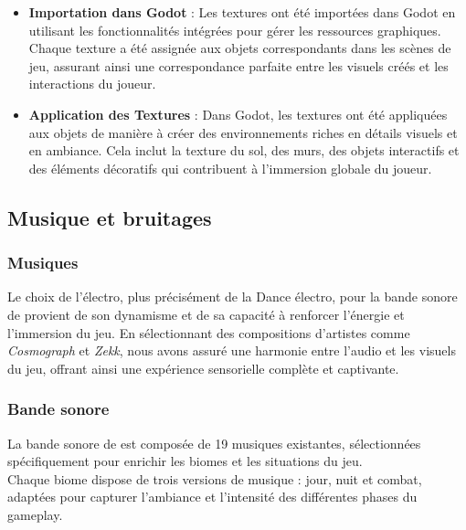 \begin{itemize}
    \item \textbf{Importation dans Godot} : Les textures ont été importées dans Godot en utilisant les fonctionnalités intégrées pour gérer les ressources graphiques. Chaque texture a été assignée aux objets correspondants dans les scènes de jeu, assurant ainsi une correspondance parfaite entre les visuels créés et les interactions du joueur.
    \\

    \item \textbf{Application des Textures} : Dans Godot, les textures ont été appliquées aux objets de manière à créer des environnements riches en détails visuels et en ambiance. Cela inclut la texture du sol, des murs, des objets interactifs et des éléments décoratifs qui contribuent à l'immersion globale du joueur.
\end{itemize}








\subsection{Musique et bruitages}

\subsubsection{Musiques}

Le choix de l'électro, plus précisément de la Dance électro, pour la bande sonore de \gameName provient de son dynamisme et de sa capacité à renforcer l'énergie et l'immersion du jeu.
En sélectionnant des compositions d'artistes comme \textit{Cosmograph} et \textit{Zekk}, nous avons assuré une harmonie entre l'audio et les visuels du jeu, offrant ainsi une expérience sensorielle complète et captivante.

\subsubsection{Bande sonore}

La bande sonore de \gameName est composée de 19 musiques existantes, sélectionnées spécifiquement pour enrichir les biomes et les situations du jeu.
\\

Chaque biome dispose de trois versions de musique : jour, nuit et combat, adaptées pour capturer l'ambiance et l'intensité des différentes phases du gameplay.
\\

